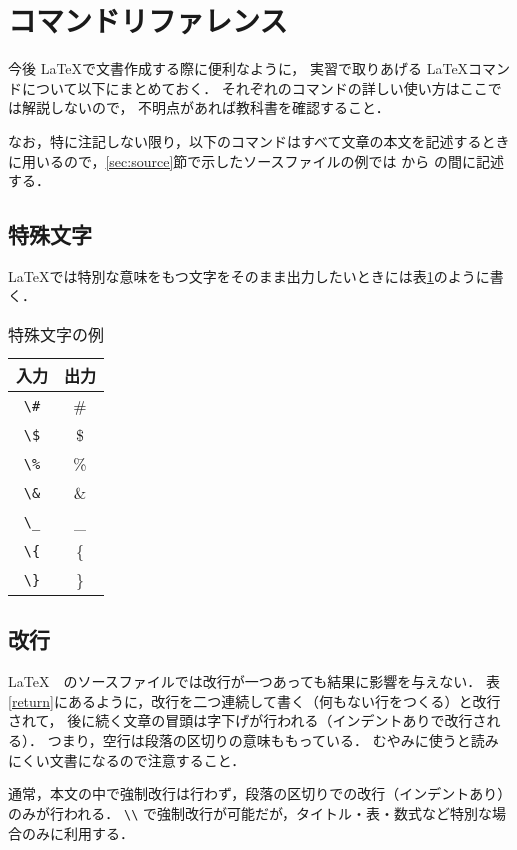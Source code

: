 \section{コマンドリファレンス}
\label{sec:command_reference}

今後 \LaTeX で文書作成する際に便利なように，
実習で取りあげる \LaTeX コマンドについて以下にまとめておく．
それぞれのコマンドの詳しい使い方はここでは解説しないので，
不明点があれば教科書\cite{TeXText}を確認すること．

なお，特に注記しない限り，以下のコマンドはすべて文章の本文を記述するときに用いるので，\ref{sec:source}節で示したソースファイルの例では \verb|| から \verb|| の間に記述する．

\subsection{特殊文字}

\LaTeX では特別な意味をもつ文字をそのまま出力したいときには表\ref{special}のように書く．

\begin{table}[h]
    \caption{特殊文字の例}
    \label{special}
    \centering
    \begin{tabular}{c|c}
        入力 & 出力 \\ \hline
        \verb|\#| & \# \\
        \verb|\$| & \$ \\
        \verb|\%| & \%\\
        \verb|\&| & \& \\
        \verb|\_| & \_\\
        \verb|\{| & \{ \\
        \verb|\}| & \} \\
    \end{tabular}
\end{table}

\subsection{改行}
\label{sec:return}

\LaTeX　のソースファイルでは改行が一つあっても結果に影響を与えない．
表\ref{return}にあるように，改行を二つ連続して書く（何もない行をつくる）と改行されて，
後に続く文章の冒頭は字下げが行われる（インデントありで改行される）．
つまり，空行は段落の区切りの意味ももっている．
むやみに使うと読みにくい文書になるので注意すること．

通常，本文の中で強制改行は行わず，段落の区切りでの改行（インデントあり）のみが行われる．
\verb|\\| で強制改行が可能だが，タイトル・表・数式など特別な場合のみに利用する．

